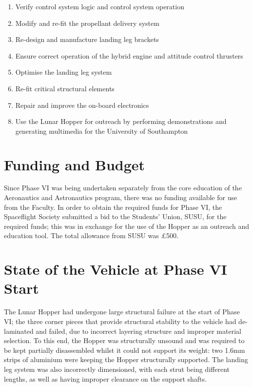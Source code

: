 \documentclass[12pt]{article}
\begin{document}
\begin{enumerate}

\item Verify control system logic and control system operation
\item Modify and re-fit the propellant delivery system
\item Re-design and manufacture landing leg brackets
\item Ensure correct operation of the hybrid engine and attitude control thrusters
\item Optimise the landing leg system
\item Re-fit critical structural elements
\item Repair and improve the on-board electronics
\item Use the Lunar Hopper for outreach by performing demonstrations and generating multimedia for the University of Southampton

\end{enumerate}

\section{Funding and Budget}

Since Phase VI was being undertaken separately from the core education of the Aeronautics and Astronautics program, there was no funding available for use from the Faculty. In order to obtain the required funds for Phase VI, the Spaceflight Society submitted a bid to the Students' Union, SUSU, for the required funds; this was in exchange for the use of the Hopper as an outreach and education tool. The total allowance from SUSU was \pounds 500. 

\section{State of the Vehicle at Phase VI Start}

The Lunar Hopper had undergone large structural failure at the start of Phase VI; the three corner pieces that provide structural stability to the vehicle had de-laminated and failed, due to incorrect layering structure and improper material selection. To this end, the Hopper was structurally unsound and was required to be kept partially disassembled whilst it could not support its weight: two 1.6mm strips of aluminium were keeping the Hopper structurally supported. The landing leg system was also incorrectly dimensioned, with each strut being different lengths, as well as having improper clearance on the support shafts.
\end{document}
